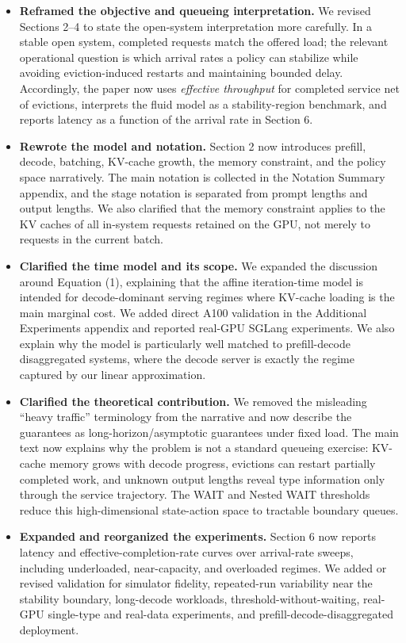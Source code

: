 \documentclass[11pt]{article}
\begin{document}
\begin{itemize}
    \item \textbf{Reframed the objective and queueing interpretation.} We revised Sections 2--4 to state the open-system interpretation more carefully. In a stable open system, completed requests match the offered load; the relevant operational question is which arrival rates a policy can stabilize while avoiding eviction-induced restarts and maintaining bounded delay. Accordingly, the paper now uses \emph{effective throughput} for completed service net of evictions, interprets the fluid model as a stability-region benchmark, and reports latency as a function of the arrival rate in Section 6.
    \item \textbf{Rewrote the model and notation.} Section 2 now introduces prefill, decode, batching, KV-cache growth, the memory constraint, and the policy space narratively. The main notation is collected in the Notation Summary appendix, and the stage notation is separated from prompt lengths and output lengths. We also clarified that the memory constraint applies to the KV caches of all in-system requests retained on the GPU, not merely to requests in the current batch.
    \item \textbf{Clarified the time model and its scope.} We expanded the discussion around Equation (1), explaining that the affine iteration-time model is intended for decode-dominant serving regimes where KV-cache loading is the main marginal cost. We added direct A100 validation in the Additional Experiments appendix and reported real-GPU SGLang experiments. We also explain why the model is particularly well matched to prefill-decode disaggregated systems, where the decode server is exactly the regime captured by our linear approximation.
    \item \textbf{Clarified the theoretical contribution.} We removed the misleading ``heavy traffic'' terminology from the narrative and now describe the guarantees as long-horizon/asymptotic guarantees under fixed load. The main text now explains why the problem is not a standard queueing exercise: KV-cache memory grows with decode progress, evictions can restart partially completed work, and unknown output lengths reveal type information only through the service trajectory. The WAIT and Nested WAIT thresholds reduce this high-dimensional state-action space to tractable boundary queues.
    \item \textbf{Expanded and reorganized the experiments.} Section 6 now reports latency and effective-completion-rate curves over arrival-rate sweeps, including underloaded, near-capacity, and overloaded regimes. We added or revised validation for simulator fidelity, repeated-run variability near the stability boundary, long-decode workloads, threshold-without-waiting, real-GPU single-type and real-data experiments, and prefill-decode-disaggregated deployment.

\end{itemize}
\end{document}
